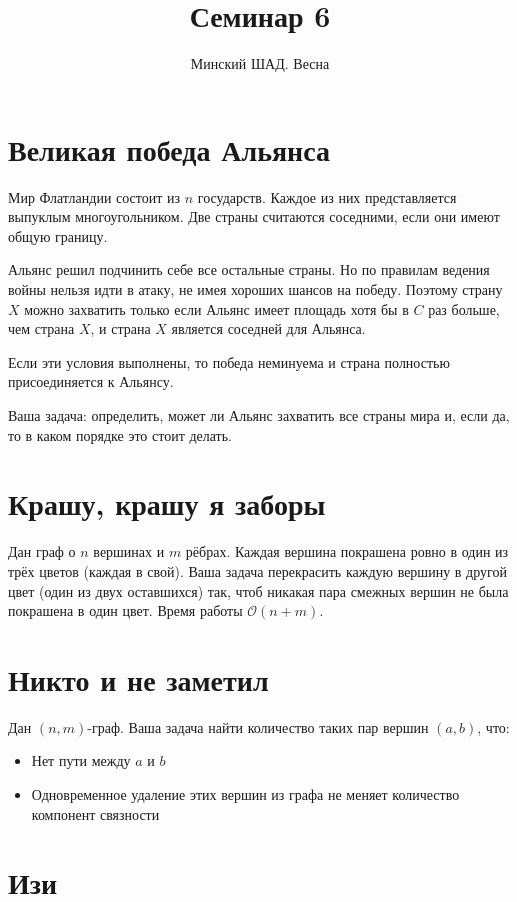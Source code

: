 \documentclass[addpoints]{exam}
\title{Семинар 6}
\author{Минский ШАД. Весна}
\begin{document}
\maketitle

\section{Великая победа Альянса}

Мир Флатландии состоит из $n$ государств. Каждое из них представляется выпуклым многоугольником. Две страны считаются соседними, если они имеют общую границу.

Альянс решил подчинить себе все остальные страны. Но по правилам ведения войны нельзя идти в атаку, не имея хороших шансов на победу. Поэтому страну $X$ можно захватить только если Альянс имеет площадь хотя бы в $C$ раз больше, чем страна $X$, и страна $X$ является соседней для Альянса.

Если эти условия выполнены, то победа неминуема и страна полностью присоединяется к Альянсу.

Ваша задача: определить, может ли Альянс захватить все страны мира и, если да, то в каком порядке это стоит делать.

\section{Крашу, крашу я заборы}

Дан граф о $n$ вершинах и $m$ рёбрах. Каждая вершина покрашена ровно в один из трёх цветов (каждая в свой). Ваша задача перекрасить каждую вершину в другой цвет (один из двух оставшихся) так, чтоб никакая пара смежных вершин не была покрашена в один цвет. Время работы $\mathcal{O}(n + m)$.

\section{Никто и не заметил}

Дан $(n,m)$-граф. Ваша задача найти количество таких пар вершин $(a,b)$, что:

\begin{itemize}
\item Нет пути между $a$ и $b$
\item Одновременное удаление этих вершин из графа не меняет количество компонент связности
\end{itemize}

\section{Изи}
\end{document}
